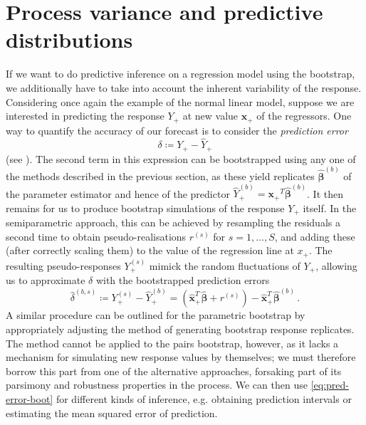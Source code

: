 \documentclass[a4paper]{book}
\begin{document}
\section{Process variance and predictive distributions} \label{sec:boot-proc}

If we want to do predictive inference on a regression model using the bootstrap, we additionally have to take into account the inherent variability of the response. Considering once again the example of the normal linear model, suppose we are interested in predicting the response $Y_+$ at new value $\mathbf{x_+}$ of the regressors. One way to quantify the accuracy of our forecast is to consider the \emph{prediction error}
\begin{equation}
  \delta \coloneqq Y_+ - \widehat{Y}_+
\end{equation}
(see \cite[Algorithm 6.4]{davison}). The second term in this expression can be bootstrapped using any one of the methods described in the previous section, as these yield replicates $\widehat{\bm{\beta}}^{(b)}$ of the parameter estimator and hence of the predictor $\widehat{Y}^{(b)}_+ = \mathbf{x_+}^T \widehat{\bm{\beta}}^{(b)}$. It then remains for us to produce bootstrap simulations of the response $Y_+$ itself. In the semiparametric approach, this can be achieved by resampling the residuals a second time to obtain pseudo-realisations $r^{(s)}$ for $s = 1, \dots, S$, and adding these (after correctly scaling them) to the value of the regression line at $x_+$. The resulting pseudo-responses $Y^{(s)}_+$ mimick the random fluctuations of $Y_+$, allowing us to approximate $\delta$ with the bootstrapped prediction errors
\begin{equation} \label{eq:pred-error-boot}
  \widehat{\delta}^{(b, s)} \coloneqq Y^{(s)}_+ - \widehat{Y}^{(b)}_+ = (\widehat{\mathbf{x}}^T_+ \widehat{\bm{\beta}} + r^{(s)}) - \widehat{\mathbf{x}}^T_+ \widehat{\bm{\beta}}^{(b)} \,.
\end{equation}
A similar procedure can be outlined for the parametric bootstrap by appropriately adjusting the method of generating bootstrap response replicates. The method cannot be applied to the pairs bootstrap, however, as it lacks a mechanism for simulating new response values by themselves; we must therefore borrow this part from one of the alternative approaches, forsaking part of its parsimony and robustness properties in the process. We can then use \cref{eq:pred-error-boot} for different kinds of inference, e.g. obtaining prediction intervals or estimating the mean squared error of prediction.
\end{document}
